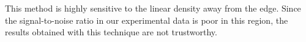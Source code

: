 \documentclass[submission, Phys]{SciPost}
\begin{document}




This method is highly sensitive to the linear density away from the edge. Since the signal-to-noise ratio in our experimental data is poor in this region, the results obtained with this technique are not trustworthy.


\end{document}
